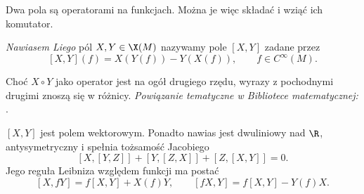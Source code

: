 Dwa pola są operatorami na funkcjach. Można je więc składać i wziąć
ich komutator.
\begin{definicja}
\emph{Nawiasem Liego} pól $X,Y\in\X(M)$ nazywamy pole $[X,Y]$ zadane przez
\begin{equation}\label{eq:nawias-def}
 [X,Y](f)=X(Y(f))-Y(X(f)),\qquad f\in C^\infty(M).
\end{equation}
\end{definicja}

Choć $X\circ Y$ jako operator jest na ogół drugiego rzędu, wyrazy z
pochodnymi drugimi znoszą się w różnicy.
\noindent\emph{Powiązanie tematyczne w Bibliotece matematycznej:} .

\begin{fakt}\label{fakt:nawias-wlasnosci}
$[X,Y]$ jest polem wektorowym. Ponadto nawias jest dwuliniowy nad $\R$,
antysymetryczny i spełnia tożsamość Jacobiego
\[
 [X,[Y,Z]]+[Y,[Z,X]]+[Z,[X,Y]]=0.
\]
Jego reguła Leibniza względem funkcji ma postać
\begin{equation}\label{eq:nawias-leibniz}
 [X,fY]=f[X,Y]+X(f)Y,\qquad [fX,Y]=f[X,Y]-Y(f)X.
\end{equation}
\end{fakt}
